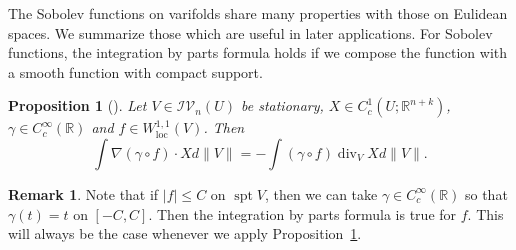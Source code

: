 \documentclass[11pt]{amsart}
\newtheorem{proposition}[theorem]{Proposition}
\theoremstyle{definition}
\newtheorem{remark}[theorem]{Remark}
\newcommand{\R}{\mathbb{R}}
\newcommand{\IV}{\mathcal{IV}}
\newcommand{\loc}{\mathrm{loc}}
\DeclareMathOperator{\spt}{spt}
\DeclareMathOperator{\Div}{div}
\begin{document}
The Sobolev functions on varifolds share many properties with those on Eulidean spaces.  We summarize those which are useful in later applications.
For Sobolev functions, the integration by parts formula holds if we compose the function with a smooth function with compact support.

\begin{proposition}[{\cite[Remark 5.2]{Me1sobolev}}]\label{integration.by.parts}
	Let $V\in \IV_n(U)$ be stationary, $X\in C_c^1(U;\R^{n+k})$, $\gamma\in C_c^\infty(\R)$ and $f\in W^{1,1}_\loc(V)$. Then 
	\[\int \nabla (\gamma\circ f)\cdot Xd\|V\|=-\int (\gamma\circ f)\Div_{V}X d\|V\|.\]
\end{proposition}
\begin{remark}
	Note that if $|f|\le C$ on $\spt V$, then we can take $\gamma\in C_c^\infty(\R)$ so that $\gamma(t)=t$ on $[-C,C]$. Then the integration by parts formula is true for $f$. This will always be the case whenever we apply Proposition~\ref{integration.by.parts}.
\end{remark}
\end{document}
